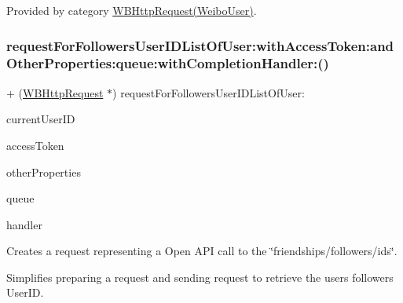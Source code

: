 Provided by category \mbox{\hyperlink{category_w_b_http_request_07_weibo_user_08_a62303f19ac35267cff108384061f1de7}{W\+B\+Http\+Request(\+Weibo\+User)}}.

\mbox{\label{interface_w_b_http_request_a62303f19ac35267cff108384061f1de7}} 
\subsubsection{\texorpdfstring{request\+For\+Followers\+User\+I\+D\+List\+Of\+User\+:with\+Access\+Token\+:and\+Other\+Properties\+:queue\+:with\+Completion\+Handler\+:()}{requestForFollowersUserIDListOfUser:withAccessToken:andOtherProperties:queue:withCompletionHandler:()}\hspace{0.1cm}{\footnotesize\ttfamily [3/3]}}
{\footnotesize\ttfamily + (\mbox{\hyperlink{interface_w_b_http_request}{W\+B\+Http\+Request}} $\ast$) request\+For\+Followers\+User\+I\+D\+List\+Of\+User\+: \begin{DoxyParamCaption}\item[{(N\+S\+String $\ast$)}]{current\+User\+ID }\item[{withAccessToken:(N\+S\+String $\ast$)}]{access\+Token }\item[{andOtherProperties:(N\+S\+Dictionary $\ast$)}]{other\+Properties }\item[{queue:(N\+S\+Operation\+Queue $\ast$)}]{queue }\item[{withCompletionHandler:(W\+B\+Request\+Handler)}]{handler }\end{DoxyParamCaption}}

Creates a request representing a Open A\+PI call to the \char`\"{}friendships/followers/ids\char`\"{}.

Simplifies preparing a request and sending request to retrieve the user\textquotesingle{}s followers\textquotesingle{} User\+ID.

